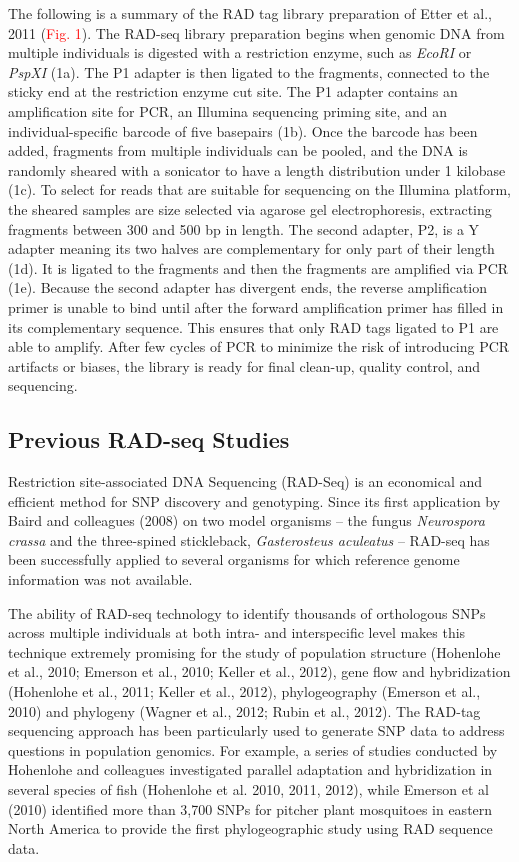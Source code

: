 \documentclass[12pt]{article}
\begin{document}
The following is a summary of the RAD tag library preparation of Etter et al., 2011 (\textcolor{red}{Fig. 1}). The RAD-seq library preparation begins when genomic DNA from multiple individuals is digested with a restriction enzyme, such as \emph{EcoRI} or \emph{PspXI} (1a). The P1 adapter is then ligated to the fragments, connected to the sticky end at the restriction enzyme cut site. The P1 adapter contains an amplification site for PCR, an Illumina sequencing priming site, and an individual-specific barcode of five basepairs (1b). Once the barcode has been added, fragments from multiple individuals can be pooled, and the DNA is randomly sheared with a sonicator to have a length distribution under 1 kilobase (1c). To select for reads that are suitable for sequencing on the Illumina platform, the sheared samples are size selected via agarose gel electrophoresis, extracting fragments between 300 and 500 bp in length. The second adapter, P2, is a Y adapter meaning its two halves are complementary for only part of their length (1d). It is ligated to the fragments and then the fragments are amplified via PCR (1e). Because the second adapter has divergent ends, the reverse amplification primer is unable to bind until after the forward amplification primer has filled in its complementary sequence. This ensures that only RAD tags ligated to P1 are able to amplify. After few cycles of PCR to minimize the risk of introducing PCR artifacts or biases, the library is ready for final clean-up, quality control, and sequencing.

\subsection{Previous RAD-seq Studies}

Restriction site-associated DNA Sequencing (RAD-Seq) is an economical and efficient method for SNP discovery and genotyping. Since its first application by Baird and colleagues (2008) on two model organisms – the fungus \emph{Neurospora crassa} and the three-spined stickleback, \emph{Gasterosteus aculeatus} – RAD-seq has been successfully applied to several organisms for which reference genome information was not available. 

The ability of RAD-seq technology to identify thousands of orthologous SNPs across multiple individuals at both intra- and interspecific level makes this technique extremely promising for the study of population structure (Hohenlohe et al., 2010; Emerson et al., 2010; Keller et al., 2012), gene flow and hybridization (Hohenlohe et al., 2011; Keller et al., 2012), phylogeography (Emerson et al., 2010) and phylogeny (Wagner et al., 2012; Rubin et al., 2012). The RAD-tag sequencing approach has been particularly used to generate SNP data to address questions in population genomics. For example, a series of studies conducted by Hohenlohe and colleagues investigated parallel adaptation and hybridization in several species of fish (Hohenlohe et al. 2010, 2011, 2012), while Emerson et al (2010) identified more than 3,700 SNPs for pitcher plant mosquitoes in eastern North America to provide the first phylogeographic study using RAD sequence data. 
\end{document}

